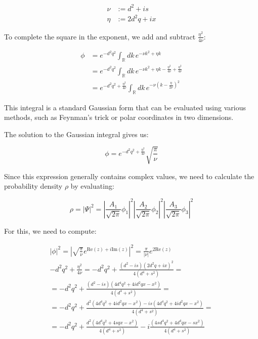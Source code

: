 \documentclass[10pt]{article}
\begin{document}
\begin{align*}
\nu &:= d^2+is \\
\eta &:= 2d^2q+ix \tag{3.15}
\end{align*}

To complete the square in the exponent, we add and subtract $\frac{\eta^2}{4\nu}$:

\begin{align*}
\phi &= e^{-d^2q^2}\int_{\mathbb{R}}dk\,e^{-\nu k^2+\eta k} \\
&= e^{-d^2q^2}\int_{\mathbb{R}}dk\,e^{-\nu k^2+\eta k-\frac{\eta^2}{4\nu}+\frac{\eta^2}{4\nu}} \tag{3.16} \\
&= e^{-d^2q^2+\frac{\eta^2}{4\nu}}\int_{\mathbb{R}}dk\,e^{-\nu\left(k-\frac{\eta}{2\nu}\right)^2}
\end{align*}

This integral is a standard Gaussian form that can be evaluated using various methods, such as Feynman's trick or polar coordinates in two dimensions.


The solution to the Gaussian integral gives us:

\begin{equation*}
\phi = e^{-d^2q^2+\frac{\eta^2}{4\nu}}\sqrt{\frac{\pi}{\nu}} \tag{3.17}
\end{equation*}

Since this expression generally contains complex values, we need to calculate the probability density $\rho$ by evaluating:

\begin{equation*}
\rho = |\Psi|^2 = \left|\frac{A_1}{\sqrt{2\pi}}\phi_1\right|^2\left|\frac{A_2}{\sqrt{2\pi}}\phi_2\right|^2\left|\frac{A_3}{\sqrt{2\pi}}\phi_3\right|^2 \tag{3.18}
\end{equation*}

For this, we need to compute:

\begin{gather*}
|\phi|^2 = \left|\sqrt{\frac{\pi}{\nu}}e^{\text{Re}(z)+i\text{Im}(z)}\right|^2 = \frac{\pi}{|\nu|}e^{2\text{Re}(z)} \tag{3.19} \\
-d^2q^2+\frac{\eta^2}{4\nu} = -d^2q^2+\frac{(d^2-is)(2d^2q+ix)^2}{4(d^4+s^2)} = \\
= -d^2q^2+\frac{(d^2-is)(4d^4q^2+4id^2qx-x^2)}{4(d^4+s^2)} = \\
= -d^2q^2+\frac{d^2(4d^4q^2+4id^2qx-x^2)-is(4d^4q^2+4id^2qx-x^2)}{4(d^4+s^2)} = \tag{3.20} \\
= -d^2q^2+\frac{d^2(4d^4q^2+4sqx-x^2)}{4(d^4+s^2)}-i\frac{(4sd^4q^2+4d^4qx-sx^2)}{4(d^4+s^2)}
\end{gather*}
\end{document}
